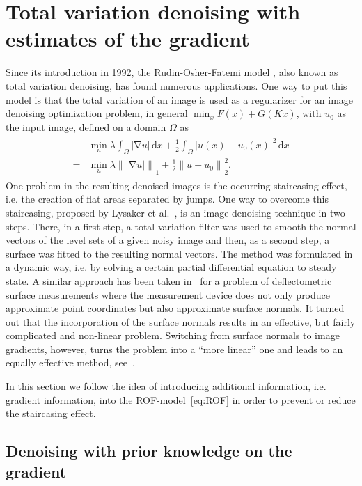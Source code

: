 \documentclass[twocolumn,envcountsame]{svjour3}
\newcommand{\norm}[2][]{{\|{#2}\|_{}}_{#1}}
\newcommand{\abs}[1]{|#1|}
\newcommand{\dd}{\,\mathrm{d}}
\DeclareMathOperator{\grad}{\nabla}
\begin{document}
\section{Total variation denoising with estimates of the gradient}
\label{sec:two-stage-denoising}

Since its introduction in 1992, the Rudin-Osher-Fatemi model \cite{rudin1992rofmodel}, 
also known as total variation denoising, has found numerous applications.
One way to put this model is that the total variation of an image is used as a regularizer for an image denoising 
optimization problem, in general $\min_x F(x) + G(Kx)$, with $u_0$ as the input image, defined on a domain $\Omega$ as
\begin{align}\label{eq:ROF}%
\begin{split}
	&\min_u \lambda \int_{\Omega} \abs{\grad u}\dd x
		+ \frac{1}{2}\int_{\Omega} \abs{u(x)-u_0(x)}^2\dd x\\
	=&\min_u \lambda \norm[1]{\abs{\grad u}} 
		+ \frac{1}{2}\norm[2]{u-u_0}^2.
\end{split}	
\end{align}
One problem in the resulting denoised images is the occurring 
staircasing effect, i.e. the creation of flat 
areas separated by jumps.
One way to overcome this staircasing, proposed by Lysaker et al.~\cite{Lysaker2004}, 
is an 
image denoising technique in two steps.
There, in a first step, a 
total variation filter was used to smooth the normal vectors of the level 
sets of a given noisy image and then, as a second step,  
a surface was fitted to the resulting normal vectors.
The method was formulated in a dynamic way, i.e. by solving a certain partial differential equation to steady state.
A similar approach has been taken in~\cite{komander2014} for a problem of 
deflectometric surface measurements where the measurement device 
does not only produce approximate point coordinates but also 
approximate surface normals. 
It turned out that the incorporation of the surface normals 
results in an effective, but fairly complicated and non-linear problem.
Switching from surface normals to image gradients, however, turns 
the problem into a ``more linear'' one and leads to an equally effective method, see~\cite{komander2014}. 

In this section we follow the idea of introducing additional 
information, i.e. gradient information, into the ROF-model~\eqref{eq:ROF}
in order to prevent or reduce the  staircasing effect. 

\subsection{Denoising with prior knowledge on the gradient}
\label{sec:denoising-wit-gradient}
\end{document}
